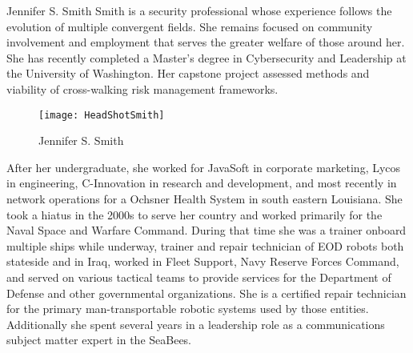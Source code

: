 \begin{IEEEbiography}{Jennifer S. Smith}
 Smith is a security professional whose experience follows the evolution of multiple convergent fields. She remains focused on community involvement and employment that serves the greater welfare of those around her. She has recently completed a Master's degree in Cybersecurity and Leadership at the University of Washington. Her capstone project assessed methods and viability of cross-walking risk management frameworks.
\begin{figure}
	\centering
	\caption{Jennifer S. Smith}
	\label{fig:HeadShotSmith}
	\texttt{[image: HeadShotSmith]}
\end{figure}
After her undergraduate, she worked for JavaSoft in corporate marketing, Lycos in engineering, C-Innovation in research and development, and most recently in network operations for a Ochsner Health System in south eastern Louisiana. She took a hiatus in the 2000s to serve her country and worked primarily for the Naval Space and Warfare Command. During that time she was a trainer onboard multiple ships while underway, trainer and repair technician of EOD robots both stateside and in Iraq, worked in Fleet Support, Navy Reserve Forces Command, and served on various tactical teams to provide services for the Department of Defense and other governmental organizations. She is a certified repair technician for the primary man-transportable robotic systems used by those entities. Additionally she spent several years in a leadership role as a communications subject matter expert in the SeaBees.
\end{IEEEbiography}

